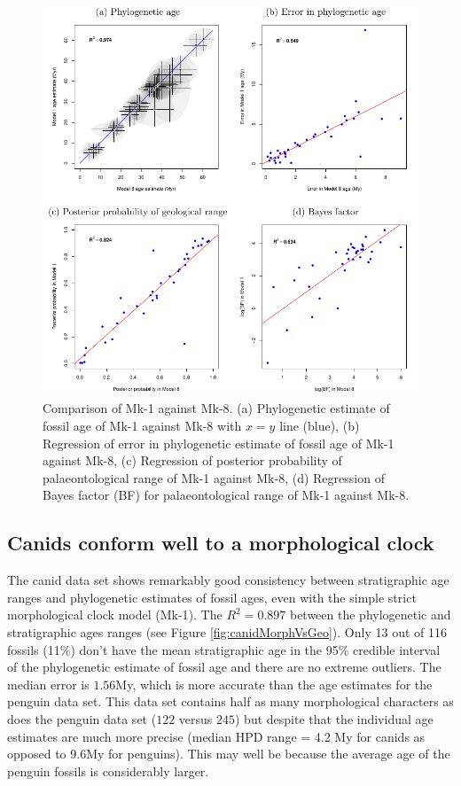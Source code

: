 \documentclass[11pt]{article}
\newcommand{\Mstrict}{{Mk-1}}
\newcommand{\Mrelaxed}{{Mk-8}}
\newcommand{\ncanidfossils}{{116}}
\begin{document}
\begin{figure}
\includegraphics{Figure_comparison.pdf}
\caption{\label{fig:compareM1M8}
Comparison of \Mstrict{} against \Mrelaxed{}. (a) Phylogenetic estimate of fossil age of \Mstrict{} against \Mrelaxed{} with $x=y$ line (blue), (b) Regression of error in phylogenetic estimate of fossil age of \Mstrict{} against \Mrelaxed{}, (c) Regression of posterior probability of palaeontological range of \Mstrict{} against \Mrelaxed{}, (d) Regression of Bayes factor (BF) for palaeontological range of \Mstrict{} against \Mrelaxed{}.}
\end{figure}





\subsection*{Canids conform well to a morphological clock}

The canid data set shows remarkably good consistency between stratigraphic age ranges and phylogenetic estimates of fossil ages, even with the simple strict morphological clock model (\Mstrict{}).
The $R^2 = 0.897$ between the phylogenetic and stratigraphic ages ranges (see Figure \ref{fig:canidMorphVsGeo}). 
Only 13 out of \ncanidfossils{} fossils (11\%) don't have the mean stratigraphic age in the 95\% credible interval of the phylogenetic estimate of fossil age and there are no extreme outliers. 
The median error is $1.56$My, which is more accurate than the age estimates for the penguin data set.
This data set contains half as many morphological characters as does the penguin data set ($122$ versus $245$) but despite that the individual age estimates are much more precise (median HPD range = 4.2 My for canids as opposed to 9.6My for penguins). This may well be because the average age of the penguin fossils is considerably larger.
\end{document}
